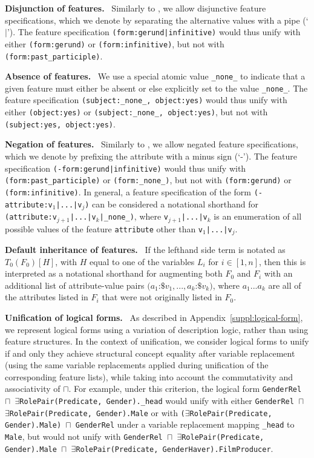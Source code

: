 \documentclass[letterpaper]{article}
\newcommand{\myparagraph}[1]{\textbf{#1}~}
\begin{document}
\myparagraph{Disjunction of features.}
Similarly to \citep{kartunnen1984features}, we allow disjunctive feature specifications, which we denote by separating the alternative values with a pipe (`$|$'). The feature specification \texttt{(form:gerund|infinitive)} would thus unify with either \texttt{(form:gerund)} or \texttt{(form:infinitive)}, but not with \texttt{(form:past_participle)}.

\myparagraph{Absence of features.}
We use a special atomic value \texttt{\_none\_} to indicate that a given feature must either be absent or else explicitly set to the value \texttt{\_none\_}. The feature specification \texttt{(subject:\_none\_, object:yes)} would thus unify with either \texttt{(object:yes)} or \texttt{(subject:\_none\_, object:yes)}, but not with \texttt{(subject:yes, object:yes)}.

\myparagraph{Negation of features.}
Similarly to \citep{kartunnen1984features}, we allow negated feature specifications, which we denote by prefixing the attribute with a minus sign (`-'). The feature specification \texttt{(-form:gerund|infinitive)} would thus unify with  \texttt{(form:past_participle)} or \texttt{(form:\_none\_)}, but not with \texttt{(form:gerund)} or \texttt{(form:infinitive)}. In general, a feature specification of the form \texttt{(-attribute:v}$_{1}$\texttt{|...|v}$_{j}$\texttt{)} can be considered a notational shorthand for \texttt{(attribute:v}$_{j+1}$\texttt{|...|v}$_{k}$\texttt{|\_none\_)}, where \texttt{v}$_{j+1}$\texttt{|...|v}$_{k}$ is an enumeration of all possible values of the feature \texttt{attribute} other than \texttt{v}$_{1}$\texttt{|...|v}$_{j}$.

\myparagraph{Default inheritance of features.}
If the lefthand side term is notated as $T_{0}(F_{0})[H]$, with $H$ equal to one of the variables $L_{i}$ for $i \in [1, n]$, then this is interpreted as a notational shorthand for augmenting both $F_{0}$ and $F_{i}$ with an additional list of attribute-value pairs $(a_{1}$:$\$v_{1}, ..., a_{k}$:$\$v_{k})$, where $a_{1} ... a_{k}$ are all of the attributes listed in $F_{i}$ that were not originally listed in $F_{0}$.

\myparagraph{Unification of logical forms.}
As described in Appendix~\ref{suppl:logical-form}, we represent logical forms using a variation of description logic, rather than using feature structures. In the context of unification, we consider logical forms to unify if and only they achieve structural concept equality after variable replacement (using the same variable replacements applied during unification of the corresponding feature lists), while taking into account the commutativity and associativity of $\sqcap$. For example, under this criterion, the logical form \texttt{GenderRel $\sqcap$ $\exists$RolePair(Predicate, Gender).\_head} would unify with either \texttt{GenderRel $\sqcap$ $\exists$RolePair(Predicate, Gender).Male} or with  \texttt{($\exists$RolePair(Predicate, Gender).Male) $\sqcap$ GenderRel} under a variable replacement mapping \texttt{\_head} to \texttt{Male}, but would not unify with  \texttt{GenderRel $\sqcap$ $\exists$RolePair(Predicate, Gender).Male $\sqcap$ $\exists$RolePair(Predicate, GenderHaver).FilmProducer}.
\end{document}
